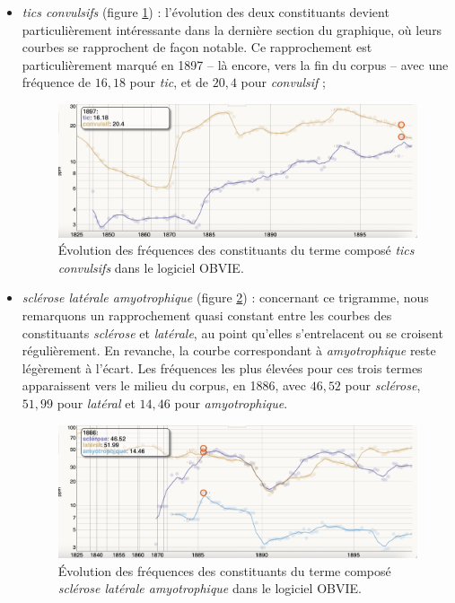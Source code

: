 \begin{itemize}
	\item \textit{tics convulsifs} (figure \ref{fig:tics}) : l'évolution des deux constituants devient particulièrement intéressante dans la dernière section du graphique, où leurs courbes se rapprochent de façon notable. Ce rapprochement est particulièrement marqué en 1897 -- là encore, vers la fin du corpus -- avec une fréquence de $16,18$ pour \textit{tic}, et de $20,4$ pour \textit{convulsif} ;
	
	\begin{figure}[h]
		\centering
		\includegraphics[width=1\textwidth]{img/tics_convulsifs.png}
		\caption{Évolution des fréquences des constituants du terme composé \textit{tics convulsifs} dans le logiciel \textsc{OBVIE}.
		}
		\label{fig:tics}
	\end{figure}
	
	
	\item \textit{sclérose latérale amyotrophique} (figure \ref{fig:SLA}) : concernant ce trigramme, nous remarquons un rapprochement quasi constant entre les courbes des constituants \textit{sclérose} et \textit{latérale}, au point qu'elles s'entrelacent ou se croisent régulièrement. En revanche, la courbe correspondant à \textit{amyotrophique} reste légèrement à l'écart. Les fréquences les plus élevées pour ces trois termes apparaissent vers le milieu du corpus, en 1886, avec $46,52$ pour \textit{sclérose}, $51,99$ pour \textit{latéral} et $14,46$ pour \textit{amyotrophique}.
	
	\begin{figure}[h]
		\centering
		\includegraphics[width=1\textwidth]{img/SLA.png}
		\caption{Évolution des fréquences des constituants du terme composé \textit{sclérose latérale amyotrophique} dans le logiciel \textsc{OBVIE}.}
		\label{fig:SLA}
	\end{figure}
	
\end{itemize}    
\bigskip

